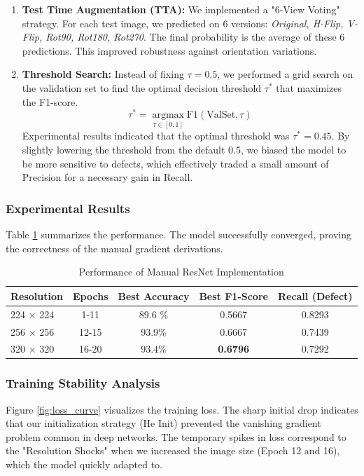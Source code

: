 \begin{enumerate}
    \item \textbf{Test Time Augmentation (TTA):} We implemented a "6-View Voting" strategy. For each test image, we predicted on 6 versions: \textit{Original, H-Flip, V-Flip, Rot90, Rot180, Rot270}. The final probability is the average of these 6 predictions. This improved robustness against orientation variations.
    \item \textbf{Threshold Search:} Instead of fixing $\tau=0.5$, we performed a grid search on the validation set to find the optimal decision threshold $\tau^*$ that maximizes the F1-score.
    \begin{equation}
        \tau^* = \operatorname*{argmax}_{\tau \in [0,1]} \text{F1}(\text{ValSet}, \tau)
    \end{equation}
    Experimental results indicated that the optimal threshold was $\tau^* = 0.45$. By slightly lowering the threshold from the default 0.5, we biased the model to be more sensitive to defects, which effectively traded a small amount of Precision for a necessary gain in Recall.
\end{enumerate}

\subsubsection{Experimental Results}
Table \ref{tab:res_results} summarizes the performance. The model successfully converged, proving the correctness of the manual gradient derivations.

\begin{table}[htbp]
\centering
\caption{Performance of Manual ResNet Implementation}
\label{tab:res_results}
\begin{tabular}{lcccc}
\hline
\textbf{Resolution} & \textbf{Epochs} & \textbf{Best Accuracy} & \textbf{Best F1-Score} & \textbf{Recall (Defect)} \\
\hline
224 $\times$ 224    & 1-11            & 89.6 \%               & 0.5667                 & 0.8293 \\
256 $\times$ 256    & 12-15           & 93.9\%                & 0.6667                 & 0.7439 \\
320 $\times$ 320    & 16-20           & 93.4\%                & \textbf{0.6796}                  & 0.7292 \\
\hline
\end{tabular}
\end{table}

\subsubsection{Training Stability Analysis}
Figure \ref{fig:loss_curve} visualizes the training loss. The sharp initial drop indicates that our initialization strategy (He Init) prevented the vanishing gradient problem common in deep networks. The temporary spikes in loss correspond to the "Resolution Shocks" when we increased the image size (Epoch 12 and 16), which the model quickly adapted to.

